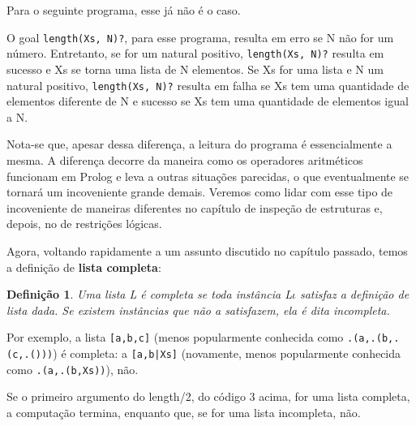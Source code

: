 \documentclass{article}
\newtheorem{definition}{Definição}[section]
\theoremstyle{remark}
\begin{document}
Para o seguinte programa, esse já não é o caso.



O goal {\tt length(Xs, N)?}, para esse programa, resulta em erro se N não for um número. Entretanto, se for um natural positivo, {\tt length(Xs, N)?} resulta em sucesso e Xs se torna uma lista de N elementos. Se Xs for uma lista e N um natural positivo, {\tt length(Xs, N)?} resulta em falha se Xs tem uma quantidade de elementos diferente de N e sucesso se Xs tem uma quantidade de elementos igual a N.

Nota-se que, apesar dessa diferença, a leitura do programa é essencialmente a mesma. A diferença decorre da maneira como os operadores aritméticos funcionam em Prolog e leva a outras situações parecidas, o que eventualmente se tornará um incoveniente grande demais. Veremos como lidar com esse tipo de incoveniente de maneiras diferentes no capítulo de inspeção de estruturas e, depois, no de restrições lógicas.

Agora, voltando rapidamente a um assunto discutido no capítulo passado, temos a definição de \textbf{lista completa}:

\begin{definition} Uma lista L é completa se toda instância L$\iota$ satisfaz a definição de lista dada. Se existem instâncias que não a satisfazem, ela é dita incompleta.
\end{definition}

Por exemplo, a lista {\tt[a,b,c]} (menos popularmente conhecida como {\tt .(a,.(b,.(c,.()))}) é completa: a {\tt[a,b|Xs]} (novamente, menos popularmente conhecida como {\tt .(a,.(b,Xs))}), não.

Se o primeiro argumento do length/2, do código 3 acima, for uma lista completa, a computação termina, enquanto que, se for uma lista incompleta, não.
\end{document}
